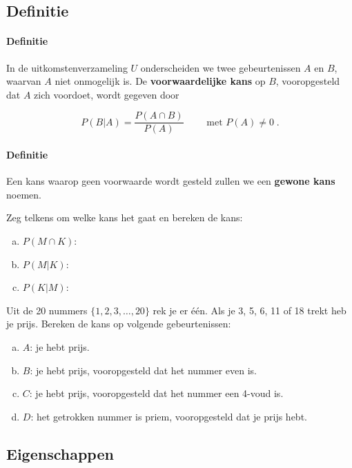 \documentclass[12pt,twoside]{article}
\begin{document}
\subsection{Definitie}

\paragraph*{Definitie}
In de uitkomstenverzameling $U$ onderscheiden we twee gebeurtenissen $A$ en $B$, waarvan $A$ niet onmogelijk is. De {\bf voorwaardelijke kans} op $B$, vooropgesteld dat $A$ zich voordoet, wordt gegeven door\\
\begin{mdframed}
$$P(B|A)=\dfrac{P(A\cap B)}{P(A)}\qquad\mbox{ met }P(A)\neq 0\;.$$
\end{mdframed}

\paragraph*{Definitie} Een kans waarop geen voorwaarde wordt gesteld zullen we een {\bf gewone kans} noemen.

\begin{oefening}
Zeg telkens om welke kans het gaat en bereken de kans:
\begin{enumerate}[(a)]
  \item $P(M\cap K)$:\arulefill
  \item $P(M|K)$:\arulefill
  \item $P(K|M)$:\arulefill
\end{enumerate}
\end{oefening}

\begin{oefening}
Uit de 20 nummers $\{1,2,3,\ldots,20\}$ rek je er één. Als je 3, 5, 6, 11 of 18 trekt heb je
prijs. Bereken de kans op volgende gebeurtenissen:
\begin{enumerate}[(a)]
  \item $A$: je hebt prijs.
  \item $B$: je hebt prijs, vooropgesteld dat het nummer even is.
  \item $C$: je hebt prijs, vooropgesteld dat het nummer een 4-voud is.
  \item $D$: het getrokken nummer is priem, vooropgesteld dat je prijs hebt.
\end{enumerate}
\end{oefening}

\subsection{Eigenschappen}
\end{document}
